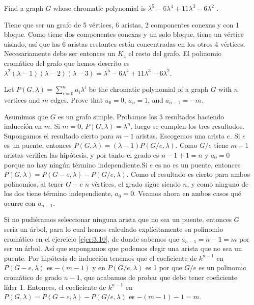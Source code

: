 \documentclass[twoside]{article}
\begin{document}
\newpage

\begin{ejercicio}{3.8}
Find a graph $G$ whose chromatic polynomial is $λ^5 − 6λ^4 + 11λ^3 − 6λ^2$
.
\end{ejercicio}
\begin{solucion}
Tiene que ser un grafo de 5 vértices, 6 aristas, 2 componentes conexas y con 1 bloque. Como tiene dos componentes conexas y un solo bloque, tiene un vértice aislado, así que las 6 aristas restantes están concentradas en los otros 4 vértices. Necesariamente debe ser entonces un $K_4$ el resto del grafo. El polinomio cromático del grafo que hemos descrito es $\lambda^2(\lambda-1)(\lambda-2)(\lambda-3)=λ^5 − 6λ^4 + 11λ^3 − 6λ^2$.



\end{solucion}
\newpage

\begin{ejercicio}{3.9}
Let $P(G, λ) = \sum^n_{i=0} a_iλ^i$ be the chromatic polynomial of a graph $G$ with $n$ vertices and
$m$ edges. Prove that $a_0 = 0$, $a_n = 1$, and $a_{n−1} = −m$.
\end{ejercicio}
\begin{solucion}
Asumimos que $G$ es un grafo simple. Probamos los 3 resultados haciendo inducción en $m$. Si $m=0$, $P(G,\lambda)=\lambda^n$, luego se cumplen los tres resultados. Supongamos el resultado cierto para $m-1$ aristas. Escogemos una arista $e$. Si $e$ es un puente, entonces $P(G,\lambda)=(\lambda-1)P(G/e,\lambda)$. Como $G/e$ tiene $m-1$ aristas verifica las hipótesis, y por tanto el grado es $n-1+1=n$ y $a_0=0$ porque no hay ningún término independiente.Si $e$ es no es un puente, entonces $P(G,\lambda)=P(G-e,\lambda)-P(G/e,\lambda)$. Como el resultado es cierto para ambos polinomios, al tener $G-e$ $n$ vértices, el grado sigue siendo $n$, y como ninguno de los dos tiene término independiente, $a_0=0$. Veamos ahora en ambos casos qué ocurre con $a_{n-1}$.

Si no pudiéramos seleccionar ninguna arista que no sea un puente, entonces $G$ sería un árbol, para lo cual hemos calculado explícitamente su polinomio cromático en el ejercicio \ref{ejer:3.10}, de donde sabemos que $a_{n-1}=n-1=m$ por ser un árbol. Así que supongamos que podemos elegir una arista que no sea un puente. Por hipótesis de inducción tenemos que el coeficiente de $k^{n-1}$ en $P(G-e,\lambda)$ es $-(m-1)$ y en $P(G/e,\lambda)$ es 1 por que $G/e$ es un polinomio cromático de grado $n-1$, que acabamos de probar que debe tener coeficiente líder 1. Entonces, el coeficiente de $k^{n-1}$ en $P(G,\lambda)=P(G-e,\lambda)-P(G/e,\lambda)$ es $-(m-1)-1=m$. 

\end{solucion}
\end{document}
